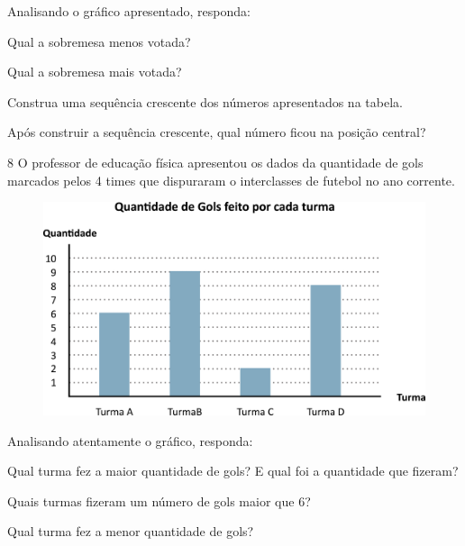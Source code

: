 Analisando o gráfico apresentado, responda:

\begin{escolha}
\item Qual a sobremesa menos votada?


\item Qual a sobremesa mais votada?


\item Construa uma sequência crescente dos números apresentados na tabela.


\item Após construir a sequência crescente, qual número ficou na posição central?

\end{escolha}

\num{8} O professor de educação física apresentou os dados da quantidade de gols
marcados pelos 4 times que dispuraram o interclasses de futebol no ano
corrente.

\begin{figure}[htpb!]
\centering
\includegraphics[width=.8\textwidth]{./media/image83.png}
\end{figure}

\pagebreak
Analisando atentamente o gráfico, responda:

\begin{escolha}
\item Qual turma fez a maior quantidade de gols? E qual foi a quantidade que fizeram?


\item Quais turmas fizeram um número de gols maior que 6?


\item Qual turma fez a menor quantidade de gols?

\end{escolha}

